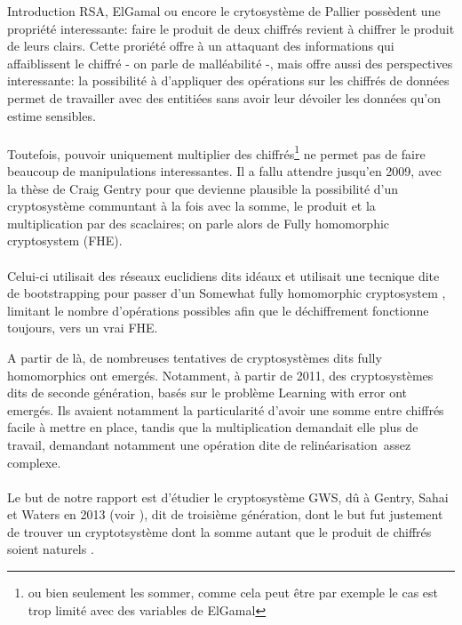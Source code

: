 \begin{section}{Introduction}
	RSA, ElGamal ou encore le crytosystème de Pallier possèdent 
	une propriété interessante: faire le produit de deux chiffrés 
	revient à chiffrer le produit de leurs clairs. 
	Cette proriété offre à un attaquant des informations qui affaiblissent 
	le chiffré - on parle de malléabilité -, mais offre aussi des
	perspectives interessante: la possibilité à
	d'appliquer des opérations sur les chiffrés de données permet 
	de travailler avec des entitiées sans avoir leur dévoiler les données 
	qu'on estime sensibles.

	\paragraph{}
	Toutefois, pouvoir uniquement multiplier des chiffrés\footnote{ou
	bien seulement les sommer, comme cela peut être par exemple le cas est trop limité 
	avec des variables de ElGamal} ne permet pas de faire beaucoup de manipulations 
	interessantes.
        Il a fallu attendre jusqu'en 2009, avec la thèse de 
	Craig Gentry \cite{gentry_thesis} pour que 
	devienne plausible la possibilité d'un cryptosystème \og communtant \fg 
	à la fois avec la somme, le produit et la multiplication par des
	scaclaires; on parle alors de \og Fully homomorphic cryptosystem \fg
	(FHE).

	\paragraph{}
	Celui-ci utilisait des réseaux euclidiens dits \og idéaux
	\fg et utilisait une tecnique dite de \og bootstrapping \fg 
	pour passer d'un \og Somewhat fully homomorphic cryptosystem \fg, 
	limitant le nombre d'opérations possibles afin que le déchiffrement 
	fonctionne toujours, vers un vrai FHE.

	A partir de là, de nombreuses tentatives de cryptosystèmes dits \og
	fully homomorphics \fg ont emergés. 	
	Notamment, à partir de 2011, des cryptosystèmes dits de seconde
	génération, basés sur le problème Learning with error ont emergés. Ils 
	avaient notamment la particularité d'avoir une somme entre chiffrés 
	facile à mettre en place, tandis que la multiplication demandait elle 
	plus de travail, demandant notamment une opération dite de \og
	relinéarisation \fg assez complexe.

	\paragraph{}
	Le but de notre rapport est d'étudier le cryptosystème GWS, dû à 
	Gentry, Sahai et Waters en 2013 (voir \cite{EPRINT:GenSahWat13}), dit
	de troisième génération, dont le but fut justement de trouver un
	cryptotsystème dont la somme autant que le produit de chiffrés
	soient \og naturels \fg. 


\end{section}

